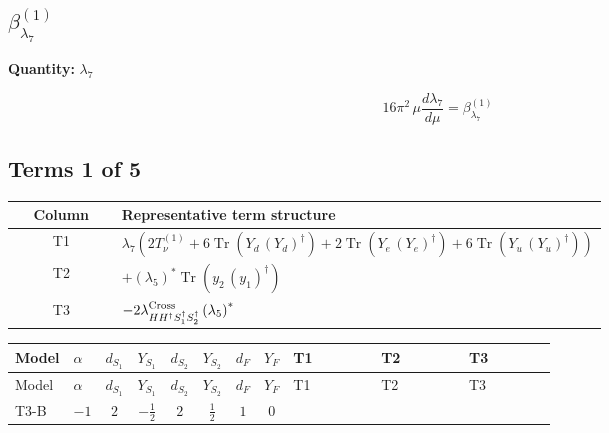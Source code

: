 \documentclass[8pt]{article}
\begin{document}
\begin{landscape}
\section*{$\beta_{\lambda_{7}}^{(1)}$}
\noindent\textbf{Quantity: }$\lambda_{7}$\par\smallskip
\[16\pi^2\,\mu\frac{d \lambda_{7}}{d\mu}=\beta_{\lambda_{7}}^{(1)}\]
\subsection*{Terms 1 of 5}
\begin{center}
\begin{tabular}{@{}c >{\raggedright\arraybackslash}p{0.82\linewidth}@{}}
\toprule
Column & Representative term structure \\
\midrule
T1 & \(\displaystyle {\lambda_7} (2 T_{\nu}^{(1)}+6 \operatorname{Tr}\!\left({Y_d}\,\left({Y_d}\right)^{\dagger}\right)+2 \operatorname{Tr}\!\left({Y_e}\,\left({Y_e}\right)^{\dagger}\right)+6 \operatorname{Tr}\!\left({Y_u}\,\left({Y_u}\right)^{\dagger}\right))\) \\
\midrule
T2 & \(\displaystyle +\left({\lambda_5}\right)^{*} \operatorname{Tr}\!\left({y_2}\,\left({y_1}\right)^{\dagger}\right)\) \\
\midrule
T3 & \(\displaystyle -2 {\lambda_{H H^\dagger S_1^\dagger S_2^\dagger}^{\rm Cross}} \left({\lambda_5}\right)^{*}\) \\
\midrule
\bottomrule
\end{tabular}
\end{center}
\smallskip
\tiny
\begin{longtable}{@{}llcccccc >{\raggedright\arraybackslash}p{0.21\linewidth} >{\raggedright\arraybackslash}p{0.21\linewidth} >{\raggedright\arraybackslash}p{0.21\linewidth}@{}}
\toprule
Model & $\alpha$ & $d_{S_1}$ & $Y_{S_1}$ & $d_{S_2}$ & $Y_{S_2}$ & $d_F$ & $Y_F$ & T1 & T2 & T3 \\
\midrule
\endfirsthead
\toprule
Model & $\alpha$ & $d_{S_1}$ & $Y_{S_1}$ & $d_{S_2}$ & $Y_{S_2}$ & $d_F$ & $Y_F$ & T1 & T2 & T3 \\
\midrule
\endhead
T3-B & $-1$ & $2$ & $-\frac{1}{2}$ & $2$ & $\frac{1}{2}$ & $1$ & $0$ & \scriptsize\adjustbox{max width=\linewidth}{$\begin{gathered} {\lambda_7} (2 T_{\nu}^{(1)}+6 \operatorname{Tr}\!\left({Y_d}\,\left({Y_d}\right)^{\dagger}\right)+2 \operatorname{Tr}\!\left({Y_e}\,\left({Y_e}\right)^{\dagger}\right)+6 \operatorname{Tr}\!\left({Y_u}\,\left({Y_u}\right)^{\dagger}\right))\end{gathered}$} & \scriptsize\adjustbox{max width=\linewidth}{$\begin{gathered} +\left({\lambda_5}\right)^{*} \operatorname{Tr}\!\left({y_2}\,\left({y_1}\right)^{\dagger}\right)\end{gathered}$} & \scriptsize\adjustbox{max width=\linewidth}{$\begin{gathered} -2 {\lambda_{H H^\dagger S_1^\dagger S_2^\dagger}^{\rm Cross}} \left({\lambda_5}\right)^{*}\end{gathered}$} \\

\end{longtable}
\end{landscape}
\end{document}
